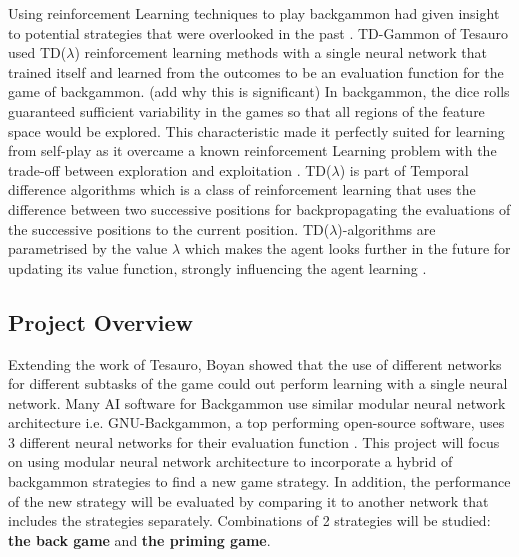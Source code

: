 \documentclass[12pt,a4paper]{article}
\begin{document}
Using reinforcement Learning techniques to play backgammon had given insight to potential strategies that were overlooked in the past \cite{rl}. TD-Gammon of Tesauro \citeyear{DBLP:conf/icml/Tesauro92} used TD($\lambda$) reinforcement learning methods with a single neural network that trained itself and learned from the outcomes to be an evaluation function for the game of backgammon. (add why this is significant) In backgammon, the dice rolls guaranteed sufficient variability in the games so that all regions of the feature space would be explored. This characteristic made it perfectly suited for learning from self-play as it overcame a known reinforcement Learning problem with the trade-off between exploration and exploitation \cite{survey}. TD($\lambda$) is part of Temporal difference algorithms which is a class of reinforcement learning that uses the difference between two successive positions for backpropagating the evaluations of the successive positions to the current position. TD($\lambda$)-algorithms are parametrised by the value $\lambda$ which makes the agent looks further in the future for updating its value function, strongly influencing the agent learning \cite{rl}.

\subsection{Project Overview}
Extending the work of Tesauro, Boyan \citeyear{boyan} showed that the use of different networks for different subtasks of the game could out perform learning with a single neural network. Many AI software for Backgammon use similar modular neural network architecture i.e. GNU-Backgammon, a top performing open-source software, uses 3 different neural networks for their evaluation function \cite{gnubg}. This project will focus on using modular neural network architecture to incorporate a hybrid of backgammon strategies to find a new game strategy. In addition, the performance of the new strategy will be evaluated by comparing it to another network that includes the strategies separately. Combinations of 2 strategies will be studied: \textbf{the back game} and \textbf{the priming game}.
\end{document}
